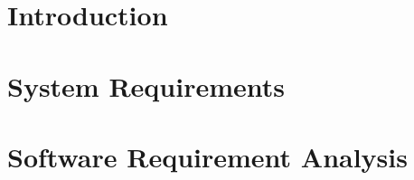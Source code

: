 \documentclass[12pt]{report}
\begin{document}

\begin{screen}
\ppttitle
\end{screen}
\footskip 0.7cm
\thispagestyle{empty} 
\pagetitle
\newpage
{}
\cfoot{\thepage}

%

%

\newpage
\tableofcontents
\newpage

\cfoot{\thepage}
\newpage
\chapter{Introduction}

\newpage
\chapter{System Requirements}

\chapter{Software Requirement Analysis}

%
%
%
%

\end{document}
